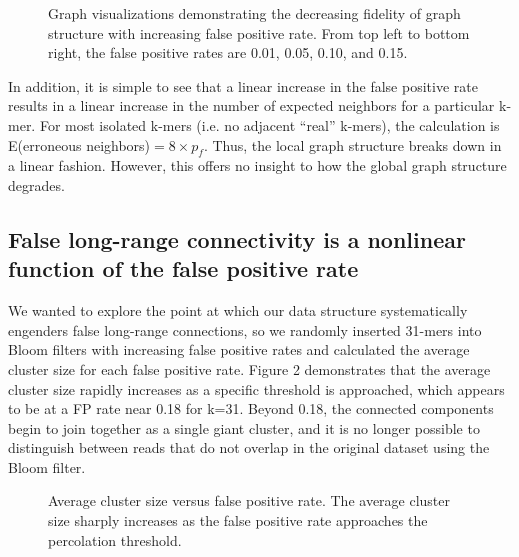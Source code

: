 \documentclass[12pt]{article} \usepackage{simplemargins}
\begin{document}
\begin{figure}
\caption{Graph visualizations demonstrating the decreasing 
fidelity of graph structure with increasing false positive rate. From 
top left to bottom right, the false positive rates are 0.01, 0.05, 0.10, 
and 0.15.}
\end{figure}

In addition, it is simple to see that a linear increase in the false 
positive rate results in a linear increase in the number of expected 
neighbors for a particular k-mer. For most isolated k-mers (i.e. no adjacent 
``real'' k-mers), the calculation is 
E(erroneous neighbors)$ = 8 \times p_f$. Thus, the local graph 
structure breaks down in a linear fashion. However, this offers no insight 
to how the global graph structure degrades.

\subsection{False long-range connectivity is a nonlinear function of the false positive rate}
We wanted to explore the point at which our data structure systematically 
engenders false long-range connections, 
so we randomly inserted 31-mers into Bloom
filters with increasing false positive rates and calculated the average
cluster size for each false positive rate. Figure 2 demonstrates that 
the average cluster
size rapidly increases as a specific threshold is approached,
which appears to be at a FP rate near 0.18 for k=31. Beyond 0.18, 
the connected components begin to join together as a single giant 
cluster, and it is no longer possible to distinguish between reads 
that do not overlap in the original dataset using the Bloom filter.

\begin{figure}
\caption{Average cluster size versus false positive rate. The average 
cluster size sharply increases as the false positive 
rate approaches the percolation threshold.
}
\end{figure}
\end{document}
